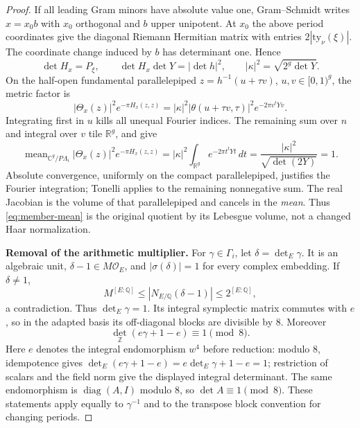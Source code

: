 \begin{proof}
If all leading Gram minors have absolute value one, Gram--Schmidt
writes $x=x_0b$ with $x_0$ orthogonal and $b$ upper unipotent.
At $x_0$ the above period coordinates give the diagonal
Riemann Hermitian matrix with entries
$2|\mathrm{ty}_\nu(\xi)|$.  The coordinate change induced by
$b$ has determinant one.  Hence
\begin{equation}\label{eq:member-hermitian-determinant}
           \det H_x=P_\xi,\qquad
           \det H_x\det Y=|\det h|^2,\qquad
           |\kappa|^2=\sqrt{2^g\det Y}.
\end{equation}
On the half-open fundamental parallelepiped
$z=h^{-1}(u+\tau v)$, $u,v\in[0,1)^g$, the metric factor is
\[
 |\Theta_x(z)|^2e^{-\pi H_x(z,z)}
     =|\kappa|^2|\theta(u+\tau v,\tau)|^2
                         e^{-2\pi v^tYv}.
\]
Integrating first in $u$ kills all unequal Fourier indices.
The remaining sum over $n$ and integral over $v$ tile
$\mathbb R^g$, and give
\begin{equation}\label{eq:member-mean}
 \operatorname{mean}_{\mathbb C^g/P\Lambda_i}
        |\Theta_x(z)|^2e^{-\pi H_x(z,z)}
       =|\kappa|^2\int_{\mathbb R^g}e^{-2\pi t^tYt}\,dt
       =\frac{|\kappa|^2}{\sqrt{\det(2Y)}}=1.
\end{equation}
Absolute convergence, uniformly on the compact parallelepiped,
justifies the Fourier integration; Tonelli applies to the
remaining nonnegative sum.  The real Jacobian is the volume
of that parallelepiped and cancels in the \emph{mean}.
Thus \eqref{eq:member-mean} is the original quotient by its
Lebesgue volume, not a changed Haar normalization.

\par\medskip\noindent\textbf{Removal of the arithmetic multiplier.}
For $\gamma\in\Gamma_i$, let $\delta=\det_E\gamma$.
It is an algebraic unit, $\delta-1\in M\mathcal O_E$, and
$|\sigma(\delta)|=1$ for every complex embedding.  If $\delta\ne1$,
\[
 M^{[E:\mathbb Q]}
     \le |N_{E/\mathbb Q}(\delta-1)|
     \le 2^{[E:\mathbb Q]},
\]
a contradiction.  Thus $\det_E\gamma=1$.
Its integral symplectic matrix commutes with $e$, so in the
adapted basis its off-diagonal blocks are divisible by $8$.
Moreover
\[
                 \det_{\mathbb Z}(e\gamma+1-e)\equiv1\pmod8.
\]
Here $e$ denotes the integral endomorphism $w^4$ before reduction:
modulo $8$, idempotence gives
$\det_E(e\gamma+1-e)=e\det_E\gamma+1-e=1$;
restriction of scalars and the field norm give the displayed
integral determinant.  The same endomorphism is
$\operatorname{diag}(A,I)$ modulo $8$, so $\det A\equiv1\pmod8$.
These statements apply equally to $\gamma^{-1}$ and to the
transpose block convention for changing periods.


\end{proof}
